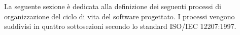 La seguente sezione è dedicata alla definizione dei seguenti processi di organizzazione del ciclo di vita del software progettato. I processi vengono suddivisi in quattro sottosezioni secondo lo standard ISO/IEC 12207:1997.


\newpage

\newpage

\newpage

\newpage

